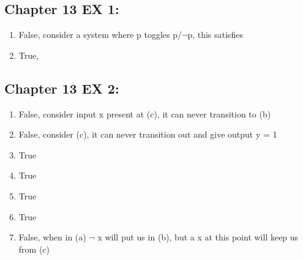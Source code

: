 \documentclass[twoside]{article}
\newenvironment{qparts}{\begin{enumerate}[{(}a{)}]}{\end{enumerate}}
\begin{document}
\subsection*{Chapter 13 EX 1:}
\begin{qparts}
\item False, consider a system where p toggles p/$\neg$p, this satisfies 
\item True, 
\end{qparts}

\subsection*{Chapter 13 EX 2:}
\begin{qparts}
\item False, consider input x present at (c), it can never transition to (b)
\item False, consider (c), it can never transition out and give output y = 1
\item True
\item True
\item True
\item True
\item False, when in (a) $\neg$ x will put us in (b), but a x at this point will keep us from (c)
\end{qparts}



\end{document}
